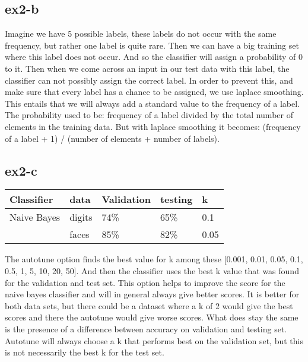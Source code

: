 \subsection{ex2-b}
Imagine we have 5 possible labels, these labels do not occur with the same frequency, but rather
one label is quite rare. Then we can have a big training set where this label does not occur. 
And so the classifier will assign a probability of 0 to it. Then when we come across an input
in our test data with this label, the classifier can not possibly assign the correct label.
In order to prevent this, and make sure that every label has a chance to be assigned, we use 
laplace smoothing. 
This entails that we will always add a  standard value to the frequency of a label. 
The probability used to be: frequency of a label divided by the total number of elements 
in the training data. But with laplace smoothing it becomes: (frequency of a label + 1) /
 (number of elements + number of labels).

\subsection{ex2-c}
\begin{table}[]
\begin{tabular}{|l|l||l|l||l|}
\hline
Classifier    & data   & Validation & testing & k \\ \hline
Naive Bayes   & digits & 74\%       & 65\%    & 0.1 \\ 
              & faces  & 85\%       & 82\%    & 0.05 \\ \hline
\end{tabular}
\end{table}

The autotune option finds the best value for k among these [0.001, 0.01, 0.05, 0.1, 0.5, 
1, 5, 10, 20, 50]. And then the classifier uses the best k value that was found for the
validation and test set. 
This option helps to improve the score for the naive bayes classifier and will in general 
always give better scores. It is better for both data sets, but there could be a dataset 
where a k of 2 would give the best scores and there the autotune would give worse scores.
What does stay the same is the presence of a difference between accuracy on validation and 
testing set. Autotune will always choose a k that performs best on the validation set, 
but this is not necessarily the best k for the test set.

